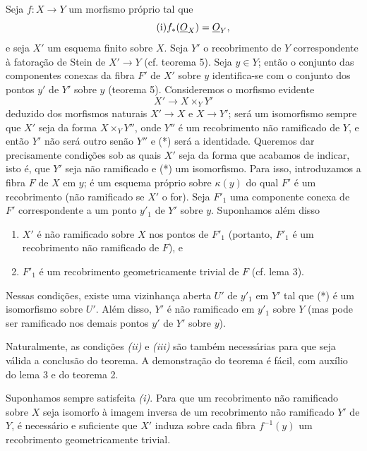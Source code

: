 Seja $f:X\longrightarrow Y$ um morfismo próprio tal que
\begin{equation}
  \tag{i}
  f_*(\underline{O}_X)=\underline{O}_Y,
\end{equation}
e seja $X'$ um esquema finito sobre $X$. Seja $Y'$ o recobrimento de $Y$
correspondente à fatoração de Stein de $X'\longrightarrow Y$
(cf. teorema 5). Seja $y\in Y$; então o conjunto das componentes conexas
da fibra $F'$ de $X'$ sobre $y$ identifica-se com o conjunto dos pontos
$y'$ de $Y'$ sobre $y$ (teorema 5). Consideremos o morfismo evidente
\begin{equation}
  \tag{*}
  X'\longrightarrow X\times_Y Y'
\end{equation}
deduzido dos morfismos naturais $X'\longrightarrow X$ e
$X\longrightarrow Y'$; será um isomorfismo sempre que $X'$ seja da forma
$X\times_Y Y''$, onde $Y''$ é um recobrimento não ramificado de $Y$, e
então $Y'$ não será outro senão $Y''$ e (*) será a identidade. Queremos dar
precisamente condições sob as quais $X'$ seja da forma que acabamos de
indicar, isto é, que $Y'$ seja não ramificado e (*) um isomorfismo. Para isso,
introduzamos a fibra $F$ de $X$ em $y$; é um esquema próprio sobre
$\kappa(y)$ do qual $F'$ é um recobrimento (não ramificado se $X'$ o for).
Seja $F'_1$ uma componente conexa de $F'$ correspondente a um ponto $y'_1$ de
$Y'$ sobre $y$. Suponhamos além disso
\begin{enumerate}
  \item[\textit{(ii)}] $X'$ é não ramificado sobre $X$ nos pontos de $F'_1$
    (portanto, $F'_1$ é um recobrimento não ramificado de $F$), e
  \item[\textit{(iii)}] $F'_1$ é um recobrimento geometricamente trivial de
    $F$ (cf. lema 3).
\end{enumerate}

 Nessas condições, existe uma vizinhança aberta $U'$ de
$y'_1$ em $Y'$ tal que (*) é um isomorfismo sobre $U'$. Além disso, $Y'$ é não
ramificado em $y'_1$ sobre $Y$ (mas pode ser ramificado nos demais pontos
$y'$ de $Y'$ sobre $y$).

Naturalmente, as condições \textit{(ii)} e \textit{(iii)} são também
necessárias para que seja válida a conclusão do teorema. A demonstração do
teorema é fácil, com auxílio do lema 3 e do teorema 2.

 Suponhamos sempre satisfeita \textit{(i)}. Para que um
recobrimento não ramificado sobre $X$ seja isomorfo à imagem inversa de um
recobrimento não ramificado $Y'$ de $Y$, é necessário e suficiente que $X'$
induza sobre cada fibra $f^{-1}(y)$ um recobrimento geometricamente trivial.

